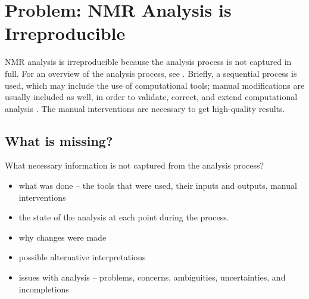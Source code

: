 \chapter{Problem: NMR Analysis is Irreproducible}

NMR analysis is irreproducible because the analysis process is not captured
in full.  For an overview of the analysis process, see \cite{guerry2011automated,
guntert2009automated, williamson2009automated}.  Briefly, a sequential process
is used, which may include the use of computational tools; manual modifications
are usually included as well, in order to validate, correct, and extend
computational analysis \cite{guerry2011automated, guntert2009automated, 
williamson2009automated}.  The manual interventions are necessary to get high-quality
results.

\section{What is missing?}
What necessary information is not captured from the analysis process?
\begin{itemize}
  \item what was done -- the tools that were used, their inputs and outputs,
    manual interventions
  
  \item the state of the analysis at each point during the process.
  
  \item why changes were made
  
  \item possible alternative interpretations
  
  \item issues with analysis -- problems, concerns, ambiguities, uncertainties,
    and incompletions
\end{itemize}

